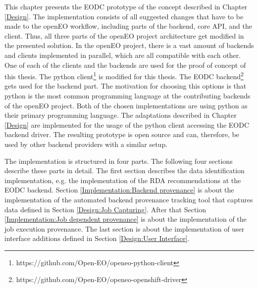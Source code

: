 \documentclass[draft,final]{vutinfth} %
\begin{document}

This chapter presents the EODC prototype of the concept described in Chapter \ref{Design}. The implementation consists of all suggested changes that have to be made to the openEO workflow, including parts of the backend, core API, and the client. Thus, all three parts of the openEO project architecture get modified in the presented solution. In the openEO project, there is a vast amount of backends and clients implemented in parallel, which are all compatible with each other. One of each of the clients and the backends are used for the proof of concept of this thesis. The python client\footnote{https://github.com/Open-EO/openeo-python-client} is modified for this thesis. The EODC backend\footnote{https://github.com/Open-EO/openeo-openshift-driver} gets used for the backend part. The motivation for choosing this options is that python is the most common programming language at the contributing backends of the openEO project. Both of the chosen implementations are using python as their primary programming language. The adaptations described in Chapter \ref{Design} are implemented for the usage of the python client accessing the EODC backend driver. The resulting prototype is open source and can, therefore, be used by other backend providers with a similar setup.  

The implementation is structured in four parts. The following four sections describe these parts in detail. The first section describes the data identification implementation, e.g. the implementation of the RDA recommendations at the EODC backend. Section \ref{Implementation:Backend provenance} is about the implementation of the automated backend provenance tracking tool that captures data defined in Section \ref{Design:Job Capturing}. After that Section \ref{Implementation:Job dependent provenance} is about the implementation of the job execution provenance. The last section is about the implementation of user interface additions defined in Section \ref{Design:User Interface}.     
\end{document}
